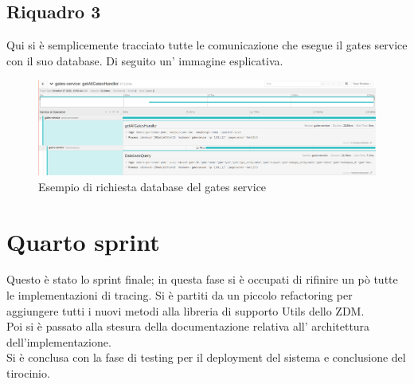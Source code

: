 \documentclass[a4paper,12pt,titlepage,italian,openany]{report}
\begin{document}
\subsection{Riquadro 3}
Qui si è semplicemente tracciato tutte le comunicazione che esegue il gates service con il suo database. Di seguito un' immagine esplicativa.
\begin{figure}[H]
    \includegraphics[scale=0.21]{90.png}
    \centering
    \caption{Esempio di richiesta database del gates service}
\end{figure}
\newpage
\section{Quarto sprint}
Questo è stato lo sprint finale; in questa fase si è occupati di rifinire un pò tutte le implementazioni di tracing. Si è partiti da un piccolo refactoring per aggiungere tutti i 
nuovi metodi alla libreria di supporto Utils dello ZDM\cite{zdm:1}.\\
Poi si è passato alla stesura della documentazione relativa all' architettura dell'implementazione.\\Si è conclusa con la fase di testing per il deployment del sistema e conclusione del tirocinio.
\end{document}
